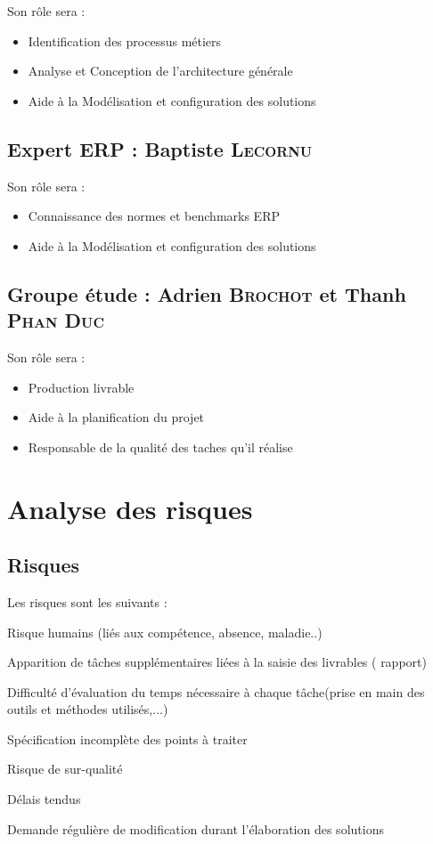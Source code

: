 Son rôle sera :
\begin{itemize}
    \item Identification des processus métiers
    \item Analyse et Conception de l’architecture générale
    \item Aide à la Modélisation et configuration des solutions 
\end{itemize}

\subsection{Expert ERP : Baptiste \textsc{Lecornu}}

Son rôle sera :
\begin{itemize}
    \item Connaissance des normes et benchmarks ERP
    \item Aide à la Modélisation et configuration des solutions 
\end{itemize}

\subsection{Groupe étude : Adrien \textsc{Brochot} et Thanh \textsc{Phan Duc}}

Son rôle sera :
\begin{itemize}
    \item Production livrable
    \item Aide à la planification du projet
    \item Responsable de la qualité des taches qu’il réalise
\end{itemize}


\section{Analyse des risques}
\subsection{Risques}

\setcounter{risques}{0}

\newcommand{\risque}[1]{
    \addtocounter{risques}{1}
    \item[R\therisques]{\indent#1}
}
Les risques sont les suivants :
\begin{description}
    \risque{Risque humains (liés aux compétence, absence, maladie..)}
    \risque{Apparition de tâches supplémentaires liées à la saisie des livrables ( rapport)}
    \risque{Difficulté d’évaluation du temps nécessaire à chaque tâche(prise en main des outils et méthodes utilisés,...)}
    \risque{Spécification incomplète des points à traiter}
    \risque{Risque de sur-qualité}
    \risque{Délais tendus}
    \risque{Demande régulière de modification durant l’élaboration des solutions}
\end{description}

